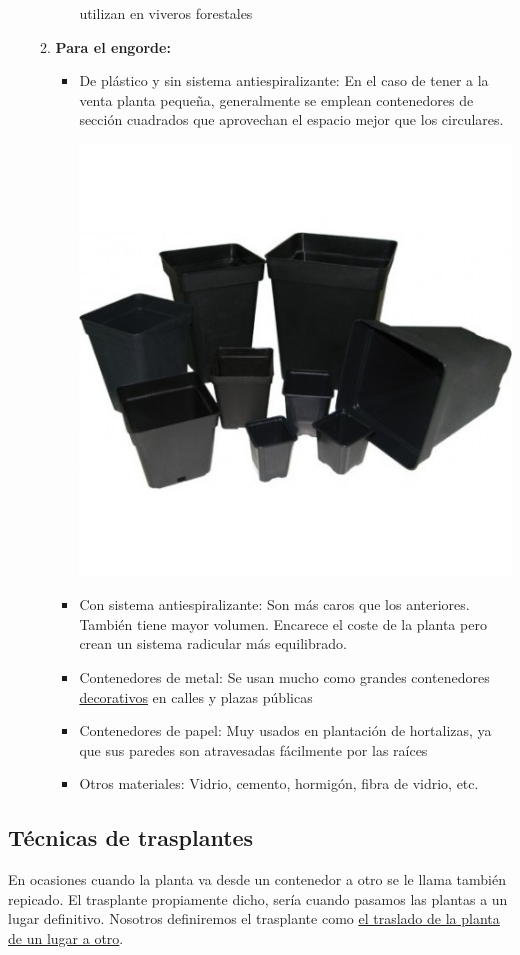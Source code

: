 \documentclass[a4paper,12pt,oneside]{article}
\begin{document}
\begin{enumerate}
\begin{enumerate}
\begin{itemize}
utilizan en viveros forestales
\end{itemize}
\item \textbf{Para el engorde:}
\begin{itemize}
\item De plástico y sin sistema antiespiralizante: En el caso de tener a la venta planta
pequeña, generalmente se emplean contenedores de sección cuadrados que
aprovechan el espacio mejor que los circulares.
\begin{center}
\includegraphics[width=.9\linewidth]{./img_uf1596/maceta_cuadrada.jpg}
\end{center}
\item Con sistema antiespiralizante: Son más caros que los anteriores. También
tiene mayor volumen. Encarece el coste de la planta pero crean un sistema
radicular más equilibrado.
\item Contenedores de metal: Se usan mucho como grandes contenedores
\uline{decorativos} en calles y plazas públicas
\item Contenedores de papel: Muy usados en plantación de hortalizas, ya que sus
paredes son atravesadas fácilmente por las raíces
\item Otros materiales: Vidrio, cemento, hormigón, fibra de vidrio, etc.
\end{itemize}
\end{enumerate}
\end{enumerate}
\subsection{Técnicas de trasplantes}
\label{sec:org0cf57fe}
En ocasiones cuando la planta va desde un contenedor a otro se le llama
también repicado. El trasplante propiamente dicho, sería cuando pasamos las
plantas a un lugar definitivo. Nosotros definiremos el trasplante como \uline{el
traslado de la planta de un lugar a otro}.
\end{document}
